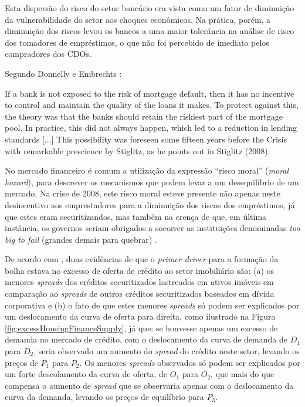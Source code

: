 \documentclass[
	12pt,				%
	oneside,			%
	a4paper,			%
	chapter=TITLE,		%
	section=TITLE,		%
	english,			%
	brazil				%
	]{abntex2}
\begin{document}
\begin{refsection}
Esta dispersão do risco do setor bancário era vista como um fator de diminuição
da vulnerabilidade do setor aos choques econômicos. Na prática, porém, a
diminuição dos riscos levou os bancos a uma maior tolerância na análise de
risco dos tomadores de empréstimos, o que não foi percebido de imediato pelos
compradores dos \gls{CDO}s.

Segundo Donnelly e Embrechts \autocite*[5]{devil}:
\begin{citacao}
If a bank is not exposed to the risk of mortgage default, then it has no
incentive to control and maintain the quality of the loans it makes. To protect
against this, the theory was that the banks should retain the riskiest part of
the mortgage pool. In practice, this did not always happen, which led to a
reduction in lending standards [...] This possibility was foreseen some fifteen
years before the Crisis with remarkable prescience by Stiglitz, as he points out
in Stiglitz (2008).
\end{citacao}
No mercado financeiro é comum a utilização da expressão ``risco moral'' (\emph{moral
hazard}), para descrever os mecanismos que podem levar a um desequilíbrio de um
mercado. Na crise de 2008, este risco moral esteve presente não apenas neste
desincentivo aos emprestadores para a diminuição dos riscos dos empréstimos, já
que estes eram securitizandos, mas também na crença de que, em última instância,
os governos seriam obrigados a socorrer as instituições denominadas \emph{too big to
fail} (grandes demais para quebrar) \autocite[4-5]{devil}.

De acordo com \textcite[p.~1203-1206]{levitin2012}, duas evidências de que o \emph{primer
driver} para a formação da bolha estava no excesso de oferta de crédito ao setor
imobiliário são: (a) os menores \emph{spreads} dos créditos securitizados lastreados
em ativos imóveis em comparação ao \emph{spreads} de outros créditos securitizados
baseados em dívida corporativa e (b) o fato de que estes menores \emph{spreads} só
podem ser explicados por um deslocamento da curva de oferta para direita, como
ilustrado na Figura \ref{fig:excessHousingFinanceSupply}, já que: se houvesse
apenas um excesso de demanda no mercado de crédito, com o deslocamento da curva
de demanda de \(D_1\) para \(D_2\), seria observado um aumento do \emph{spread} do
crédito neste setor, levando os preços de \(P_1\) para \(P_2\). Os menores \emph{spreads}
observados só podem ser explicados por um forte descolamento da curva de oferta,
de \(O_1\) para \(O_2\), que mais do que compensa o aumento de \emph{spread} que se
observaria apenas com o deslocamento da curva da demanda, levando os preços de
equilíbrio para \(P_3\).
\begin{figure}[H]


\end{figure}
\end{refsection}
\end{document}
